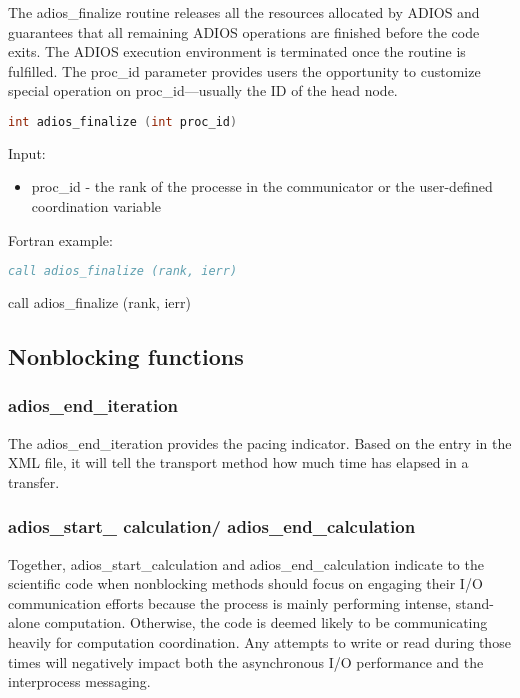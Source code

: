 The adios\_finalize routine releases all the resources allocated by ADIOS and guarantees 
that all remaining ADIOS operations are finished before the code exits. The ADIOS 
execution environment is terminated once the routine is fulfilled. The proc\_id 
parameter provides users the opportunity to customize special operation on proc\_id---usually 
the ID of the head node. 

\begin{lstlisting}[language=C,caption={},label={}]
int adios_finalize (int proc_id)
\end{lstlisting}

Input: 
\begin{itemize}
\item proc\_id - the rank of the processe in the communicator or the user-defined coordination 
variable
\end{itemize}

Fortran example: 
\begin{lstlisting}[language=Fortran,caption={},label={}]
call adios_finalize (rank, ierr)
\end{lstlisting}

call adios\_finalize (rank, ierr)\label{HToc84890237}\label{HToc212016613}\label{HToc212016855}\label{HToc182553351}

\subsection{Nonblocking functions}

\subsubsection{adios\_end\_iteration}

The adios\_end\_iteration provides the pacing indicator. Based on the entry in 
the XML file, it will tell the transport method how much time has elapsed in a 
transfer.

\subsubsection{adios\_start\_ calculation/ adios\_end\_calculation}

Together, adios\_start\_calculation and adios\_end\_calculation indicate to the 
scientific code when nonblocking methods should focus on engaging their I/O communication 
efforts because the process is mainly performing intense, stand-alone computation. 
Otherwise, the code is deemed likely to be communicating heavily for computation 
coordination. Any attempts to write or read during those times will negatively 
impact both the asynchronous I/O performance and the interprocess messaging.\label{HToc212016614}\label{HToc212016856}\label{HToc84890238}\label{HToc182553352}

